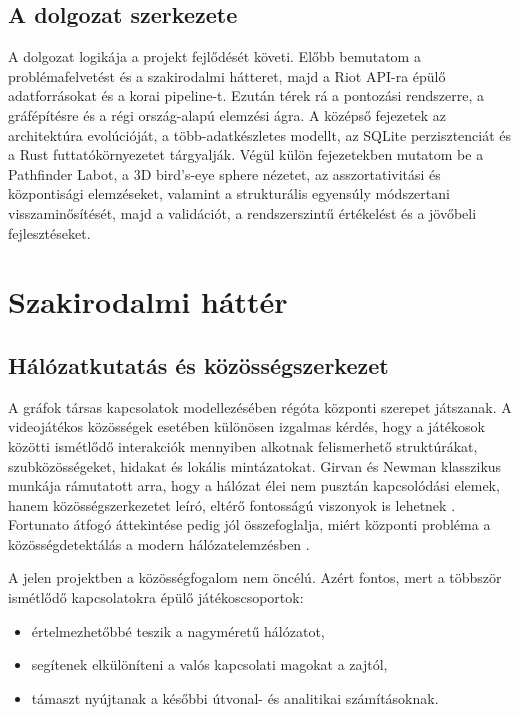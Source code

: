 ﻿\documentclass[a4paper,12pt]{report}
\begin{document}
\section{A dolgozat szerkezete}

A dolgozat logikája a projekt fejlődését követi. Előbb bemutatom a problémafelvetést és a szakirodalmi hátteret, majd a Riot API-ra épülő adatforrásokat és a korai pipeline-t. Ezután térek rá a pontozási rendszerre, a gráfépítésre és a régi ország-alapú elemzési ágra. A középső fejezetek az architektúra evolúcióját, a több-adatkészletes modellt, az SQLite perzisztenciát és a Rust futtatókörnyezetet tárgyalják. Végül külön fejezetekben mutatom be a Pathfinder Labot, a 3D bird's-eye sphere nézetet, az asszortativitási és központisági elemzéseket, valamint a strukturális egyensúly módszertani visszaminősítését, majd a validációt, a rendszerszintű értékelést és a jövőbeli fejlesztéseket.

\chapter{Szakirodalmi háttér}

\section{Hálózatkutatás és közösségszerkezet}

A gráfok társas kapcsolatok modellezésében régóta központi szerepet játszanak. A videojátékos közösségek esetében különösen izgalmas kérdés, hogy a játékosok közötti ismétlődő interakciók mennyiben alkotnak felismerhető struktúrákat, szubközösségeket, hidakat és lokális mintázatokat. Girvan és Newman klasszikus munkája rámutatott arra, hogy a hálózat élei nem pusztán kapcsolódási elemek, hanem közösségszerkezetet leíró, eltérő fontosságú viszonyok is lehetnek \cite{girvannewman}. Fortunato átfogó áttekintése pedig jól összefoglalja, miért központi probléma a közösségdetektálás a modern hálózatelemzésben \cite{fortunato2010}.

A jelen projektben a közösségfogalom nem öncélú. Azért fontos, mert a többször ismétlődő kapcsolatokra épülő játékoscsoportok:

\begin{itemize}
    \item értelmezhetőbbé teszik a nagyméretű hálózatot,
    \item segítenek elkülöníteni a valós kapcsolati magokat a zajtól,
    \item támaszt nyújtanak a későbbi útvonal- és analitikai számításoknak.
\end{itemize}
\end{document}

